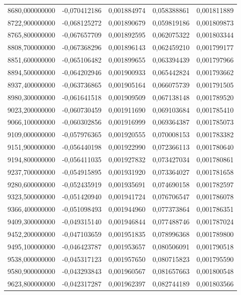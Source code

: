 \begin{longtable}{rrrrr}
8680,000000000 & -0,070412186 & 0,001884974 & 0,058388861 & 0,001811889\\
8722,900000000 & -0,068125272 & 0,001890679 & 0,059819186 & 0,001809873\\
8765,800000000 & -0,067657709 & 0,001892595 & 0,062075322 & 0,001803344\\
8808,700000000 & -0,067368296 & 0,001896143 & 0,062459210 & 0,001799177\\
8851,600000000 & -0,065106482 & 0,001899655 & 0,063394439 & 0,001797966\\
8894,500000000 & -0,064202946 & 0,001900933 & 0,065442824 & 0,001793662\\
8937,400000000 & -0,063736865 & 0,001905164 & 0,066075739 & 0,001791505\\
8980,300000000 & -0,061641518 & 0,001909509 & 0,067138148 & 0,001789520\\
9023,200000000 & -0,060730459 & 0,001911690 & 0,069103684 & 0,001785410\\
9066,100000000 & -0,060302856 & 0,001916999 & 0,069364387 & 0,001785073\\
9109,000000000 & -0,057976365 & 0,001920555 & 0,070008153 & 0,001783382\\
9151,900000000 & -0,056440198 & 0,001922990 & 0,072366113 & 0,001780640\\
9194,800000000 & -0,056411035 & 0,001927832 & 0,073427034 & 0,001780861\\
9237,700000000 & -0,054915895 & 0,001931920 & 0,073364027 & 0,001781658\\
9280,600000000 & -0,052435919 & 0,001935691 & 0,074690158 & 0,001782597\\
9323,500000000 & -0,051420940 & 0,001941724 & 0,076706547 & 0,001786078\\
9366,400000000 & -0,051098493 & 0,001944960 & 0,077373864 & 0,001786351\\
9409,300000000 & -0,049315140 & 0,001946844 & 0,077488746 & 0,001787024\\
9452,200000000 & -0,047103659 & 0,001951835 & 0,078996368 & 0,001789800\\
9495,100000000 & -0,046423787 & 0,001953657 & 0,080506091 & 0,001790518\\
9538,000000000 & -0,045317123 & 0,001957650 & 0,080715823 & 0,001795590\\
9580,900000000 & -0,043293843 & 0,001960567 & 0,081657663 & 0,001800548\\
9623,800000000 & -0,042317287 & 0,001962397 & 0,082744189 & 0,001803566\\

\end{longtable}
